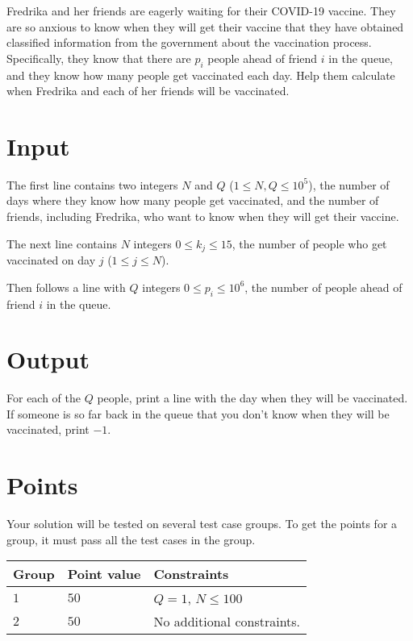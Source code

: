 
Fredrika and her friends are eagerly waiting for their COVID-19 vaccine. They are so anxious to
know when they will get their vaccine that they have obtained classified information from the
government about the vaccination process. Specifically, they know that there are $p_i$ people
ahead of friend $i$ in the queue, and they know how many people get vaccinated each day. Help
them calculate when Fredrika and each of her friends will be vaccinated.


\section*{Input}
The first line contains two integers $N$ and $Q$ ($1 \leq N, Q \leq 10^5$), the number of days
where they know how many people get vaccinated, and the number of friends, including Fredrika,
who want to know when they will get their vaccine.

The next line contains $N$ integers $0 \leq k_j \leq 15$, the number of people who get vaccinated on day $j$ ($1 \leq j \leq N$).

Then follows a line with $Q$ integers $0 \leq p_i \leq 10^6$, the number of people ahead of friend $i$ in the queue.

\section*{Output}
For each of the $Q$ people, print a line with the day when they will be vaccinated. 
If someone is so far back in the queue that you don't know when they will be vaccinated, print $-1$.

\section*{Points}
Your solution will be tested on several test case groups.
To get the points for a group, it must pass all the test cases in the group.

\noindent
\begin{tabular}{| l | l | p{12cm} |}
  \hline
  \textbf{Group} & \textbf{Point value} & \textbf{Constraints} \\ \hline
  $1$    & $50$      & $Q=1$, $N \le 100$ \\ \hline
  $2$    & $50$      & No additional constraints. \\ \hline
\end{tabular}

